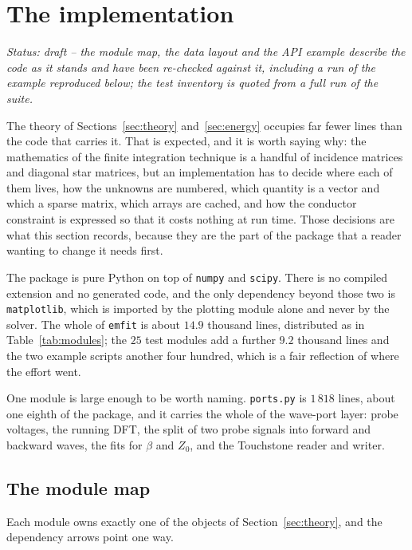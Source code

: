 \section{The implementation}
\label{sec:impl}

\noindent\emph{Status: draft -- the module map, the data layout and the API example describe the code as it
stands and have been re-checked against it, including a run of the example reproduced below; the test inventory
is quoted from a full run of the suite.}

The theory of Sections~\ref{sec:theory} and~\ref{sec:energy} occupies far fewer lines than the code that carries
it. That is expected, and it is worth saying why: the mathematics of the finite integration technique is a
handful of incidence matrices and diagonal star matrices, but an implementation has to decide where each of them
lives, how the unknowns are numbered, which quantity is a vector and which a sparse matrix, which arrays are
cached, and how the conductor constraint is expressed so that it costs nothing at run time. Those decisions are
what this section records, because they are the part of the package that a reader wanting to change it needs
first.

The package is pure Python on top of \texttt{numpy} and \texttt{scipy}. There is no compiled extension and no
generated code, and the only dependency beyond those two is \texttt{matplotlib}, which is imported by the
plotting module alone and never by the solver. The whole of \texttt{emfit} is about $14.9$ thousand lines,
distributed as in Table~\ref{tab:modules}; the $25$ test modules add a further $9.2$ thousand lines and the two
example scripts another four hundred, which is a fair reflection of where the effort went.

One module is large enough to be worth naming. \texttt{ports.py} is $1\,818$ lines, about one eighth of the
package, and it carries the whole of the wave-port layer: probe voltages, the running DFT, the split of two probe
signals into forward and backward waves, the fits for $\beta$ and $Z_0$, and the Touchstone reader and writer.

\subsection{The module map}
\label{sec:modules}

Each module owns exactly one of the objects of Section~\ref{sec:theory}, and the dependency arrows point one way.

